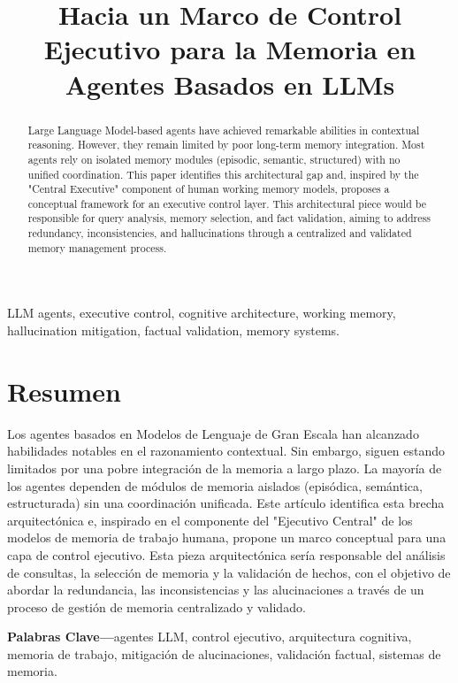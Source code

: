 \documentclass[conference]{IEEEtran}
\title{Hacia un Marco de Control Ejecutivo para la Memoria en Agentes Basados en LLMs}
\author{
    \IEEEauthorblockN{Sebastian Eduardo Francisco Puentes Prieto}
    \IEEEauthorblockA{
        Magíster en Ingeniería Informática\\
        Universidad de La Frontera\\
        Email: spuentes.01@ufromail.cl}
}
\begin{document}
\maketitle

\begin{abstract}
Large Language Model-based agents have achieved remarkable abilities in contextual reasoning. However, they remain limited by poor long-term memory integration. Most agents rely on isolated memory modules (episodic, semantic, structured) with no unified coordination. This paper identifies this architectural gap and, inspired by the "Central Executive" component of human working memory models, proposes a conceptual framework for an executive control layer. This architectural piece would be responsible for query analysis, memory selection, and fact validation, aiming to address redundancy, inconsistencies, and hallucinations through a centralized and validated memory management process.
\end{abstract}

\begin{IEEEkeywords}
LLM agents, executive control, cognitive architecture, working memory, hallucination mitigation, factual validation, memory systems.
\end{IEEEkeywords}

\section*{Resumen}
Los agentes basados en Modelos de Lenguaje de Gran Escala han alcanzado habilidades notables en el razonamiento contextual. Sin embargo, siguen estando limitados por una pobre integración de la memoria a largo plazo. La mayoría de los agentes dependen de módulos de memoria aislados (episódica, semántica, estructurada) sin una coordinación unificada. Este artículo identifica esta brecha arquitectónica e, inspirado en el componente del "Ejecutivo Central" de los modelos de memoria de trabajo humana, propone un marco conceptual para una capa de control ejecutivo. Esta pieza arquitectónica sería responsable del análisis de consultas, la selección de memoria y la validación de hechos, con el objetivo de abordar la redundancia, las inconsistencias y las alucinaciones a través de un proceso de gestión de memoria centralizado y validado.

\begin{IEEEkeywords}
\textbf{Palabras Clave---}agentes LLM, control ejecutivo, arquitectura cognitiva, memoria de trabajo, mitigación de alucinaciones, validación factual, sistemas de memoria.
\end{IEEEkeywords}
\end{document}
